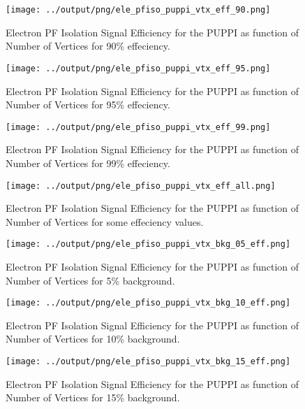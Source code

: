 \documentclass[11pt]{book}
\begin{document}
\begin{figure}[htb]
\centering
\texttt{[image: ../output/png/ele\_pfiso\_puppi\_vtx\_eff\_90.png]}
\caption{Electron PF Isolation Signal Efficiency for the PUPPI as function of Number of Vertices for 90\% effeciency.}
\label{fig:ele_pfiso_vtx_eff_puppi_eff_90}
\end{figure}

\begin{figure}[htb]
\centering
\texttt{[image: ../output/png/ele\_pfiso\_puppi\_vtx\_eff\_95.png]}
\caption{Electron PF Isolation Signal Efficiency for the PUPPI as function of Number of Vertices for 95\% effeciency.}
\label{fig:ele_pfiso_vtx_eff_puppi_eff_95}
\end{figure}

\begin{figure}[htb]
\centering
\texttt{[image: ../output/png/ele\_pfiso\_puppi\_vtx\_eff\_99.png]}
\caption{Electron PF Isolation Signal Efficiency for the PUPPI as function of Number of Vertices for 99\% effeciency.}
\label{fig:ele_pfiso_vtx_eff_puppi_eff_99}
\end{figure}

\begin{figure}[htb]
\centering
\texttt{[image: ../output/png/ele\_pfiso\_puppi\_vtx\_eff\_all.png]}
\caption{Electron PF Isolation Signal Efficiency for the PUPPI as function of Number of Vertices for some effeciency values.}
\label{fig:ele_pfiso_vtx_eff_puppi_eff_all}
\end{figure}

\begin{figure}[htb]
\centering
\texttt{[image: ../output/png/ele\_pfiso\_puppi\_vtx\_bkg\_05\_eff.png]}
\caption{Electron PF Isolation Signal Efficiency for the PUPPI as function of Number of Vertices for 5\% background.}
\label{fig:ele_pfiso_vtx_eff_puppi_bkg_05_eff}
\end{figure}

\begin{figure}[htb]
\centering
\texttt{[image: ../output/png/ele\_pfiso\_puppi\_vtx\_bkg\_10\_eff.png]}
\caption{Electron PF Isolation Signal Efficiency for the PUPPI as function of Number of Vertices for 10\% background.}
\label{fig:ele_pfiso_vtx_eff_puppi_bkg_10_eff}
\end{figure}

\begin{figure}[htb]
\centering
\texttt{[image: ../output/png/ele\_pfiso\_puppi\_vtx\_bkg\_15\_eff.png]}
\caption{Electron PF Isolation Signal Efficiency for the PUPPI as function of Number of Vertices for 15\% background.}
\label{fig:ele_pfiso_vtx_eff_puppi_bkg_15_eff}
\end{figure}
\end{document}
